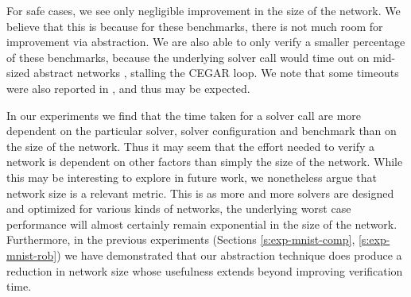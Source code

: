 For safe cases, we see only negligible improvement in the size of the network.
We believe that this is because for these benchmarks, there is not much room for
improvement via abstraction. We are also able to only verify a smaller
percentage of these benchmarks, because the underlying solver call would time
out on mid-sized abstract networks , stalling
the CEGAR loop. We note that some timeouts were also reported in
\cite{cegar-nn}, and thus may be expected. 

In our experiments we find that the time taken for a solver call are more
dependent on the particular solver, solver configuration and benchmark than on
the size of the network. Thus it may seem that the effort needed to verify a
network is dependent on other factors than simply the size of the network. While
this may be interesting to explore in future work, we nonetheless argue that
network size is a relevant metric. This is as more and more solvers are designed
and optimized for various kinds of networks, the underlying worst case
performance will almost certainly remain exponential in the size of the network.
Furthermore, in the previous experiments (Sections \ref{s:exp-mnist-comp},
\ref{s:exp-mnist-rob}) we have demonstrated that our abstraction technique does
produce a reduction in network size whose usefulness extends beyond improving
verification time. 

